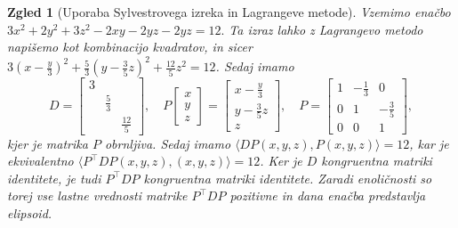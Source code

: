 \documentclass[10pt, a4paper]{article}
\newtheorem{zgled}{Zgled}[section]
\newcommand{\sprod}[2]{\langle {#1},{#2} \rangle}
\begin{document}
\begin{zgled}[Uporaba Sylvestrovega izreka in Lagrangeve metode]
    Vzemimo enačbo $3x^2 + 2y^2 + 3z^2 -2xy - 2yz - 2yz = 12.$ 
    Ta izraz lahko z Lagrangevo metodo napišemo kot kombinacijo kvadratov, in sicer $3(x - \frac{y}{3})^2 + \frac{5}{3} (y - \frac{3}{5}z)^2 + \frac{12}{5}z^2 = 12$.
    Sedaj imamo 
    \begin{equation*}
        D = \begin{bmatrix}
            3 & & \\
            & \frac{5}{3} & \\
            & & \frac{12}{5}
        \end{bmatrix}, \quad
        P \begin{bmatrix}
            x\\
            y\\
            z
        \end{bmatrix} = \begin{bmatrix}
            x - \frac{y}{3}\\
            y - \frac{3}{5}z\\
            z
        \end{bmatrix}, \quad 
        P = \begin{bmatrix}
            1 & -\frac{1}{3} & 0\\
            0 & 1 & -\frac{3}{5}\\
            0 & 0 & 1
        \end{bmatrix},
    \end{equation*}
    kjer je matrika $P$ obrnljiva. Sedaj imamo $\sprod{D P (x, y, z)}{P (x, y, z)} = 12$, kar je ekvivalentno $\sprod{P^\top D P (x, y, z)}{(x, y, z)} = 12$.
    Ker je $D$ kongruentna matriki identitete, je tudi $P^\top D P$ kongruentna matriki identitete.
    Zaradi enoličnosti so torej vse lastne vrednosti matrike $P^\top D P$ pozitivne in dana enačba predstavlja elipsoid.
\end{zgled}
\end{document}

